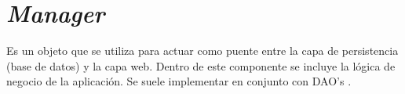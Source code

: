 \section{\textit{Manager}}

Es un objeto que se utiliza para actuar como puente entre la capa de persistencia (base de datos) y la capa web. Dentro de este componente se incluye la lógica de negocio de la aplicación. Se suele implementar en conjunto con DAO's \cite{MNG0}. 